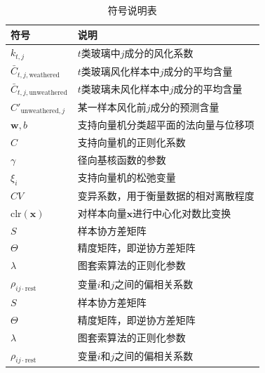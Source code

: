 \begin{table}[H]
	\centering
	\caption{符号说明表}
	\begin{tabular}{ll}
		\toprule
		\textbf{符号}                        & \textbf{说明}                     \\
		\midrule
		$k_{t,j}$                          & $t$类玻璃中$j$成分的风化系数               \\
		$\bar{C}_{t,j,\text{weathered}}$   & $t$类玻璃风化样本中$j$成分的平均含量           \\
		$\bar{C}_{t,j,\text{unweathered}}$ & $t$类玻璃未风化样本中$j$成分的平均含量          \\
		$C'_{\text{unweathered}, j}$       & 某一样本风化前$j$成分的预测含量               \\
		$\boldsymbol{w}, b$                & 支持向量机分类超平面的法向量与位移项              \\
		$C$                                & 支持向量机的正则化系数                     \\
		$\gamma$                           & 径向基核函数的参数                       \\
		$\xi_i$                            & 支持向量机的松弛变量                      \\
		$CV$                               & 变异系数，用于衡量数据的相对离散程度              \\
		$\text{clr}(\boldsymbol{x})$       & 对样本向量$\boldsymbol{x}$进行中心化对数比变换 \\
		$S$                                & 样本协方差矩阵                         \\
		$\Theta$                           & 精度矩阵，即逆协方差矩阵                    \\
		$\lambda$                          & 图套索算法的正则化参数                     \\
		$\rho_{ij \cdot \text{rest}}$      & 变量$i$和$j$之间的偏相关系数               \\
		$S$                                & 样本协方差矩阵                         \\
		$\Theta$                           & 精度矩阵，即逆协方差矩阵                    \\
		$\lambda$                          & 图套索算法的正则化参数                     \\
		$\rho_{ij \cdot \text{rest}}$      & 变量$i$和$j$之间的偏相关系数               \\
		\bottomrule
	\end{tabular}
\end{table}